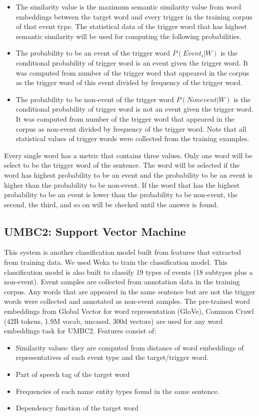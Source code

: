 \begin{itemize}
    \item The similarity value is the maximum semantic similarity value from word embeddings between the target word and every trigger in the training corpus of that event type. The statistical data of the trigger word that has highest semantic similarity will be used for computing the following probabilities. 
    \item The probability to be an event of the trigger word $P(Event_i|W)$ is the conditional probability of trigger word is an event given the trigger word. It was computed from number of the trigger word that appeared in the corpus as the trigger word of this event divided by frequency of the trigger word. 
    \item The probability to be non-event of the trigger word $P(Nonevent|W)$ is the conditional probability of trigger word is not an event given the trigger word. It was computed from number of the trigger word that appeared in the corpus as non-event divided by frequency of the trigger word. Note that all statistical values of trigger words were collected from the training examples. 
\end{itemize}
\indent Every single word has a metric that contains three values. Only one word will be select to be the trigger word of the sentence. The word will be selected if the word has highest probability to be an event and the probability to be an event is higher than the probability to be non-event. If the word that has the highest probability to be an event is lower than the probability to be non-event, the second, the third, and so on will be checked until the answer is found.

\subsection{UMBC2: Support Vector Machine}
\label{umbc2}
This system is another classification model built from features that extracted from training data. We used Weka \cite{hall2009weka} to train the classification model. This classification model is also built to classify 19 types of events (18 subtypes plus a non-event). Event samples are collected from annotation data in the training corpus. Any words that are appeared in the same sentence but are not the trigger words were collected and annotated as non-event samples. The pre-trained word embeddings from Global Vector for word representation (GloVe), Common Crawl (42B tokens, 1.9M vocab, uncased, 300d vectors) \cite{pennington2014glove} are used for any word embeddings task for UMBC2. Features consist of: 
\begin{itemize}
    \item Similarity values: they are computed from distance of word embeddings of representatives of each event type and the target/trigger word. 
    \item Part of speech tag of the target word 
    \item Frequencies of each name entity types found in the same sentence. 
    \item Dependency function of the target word 
\end{itemize}

